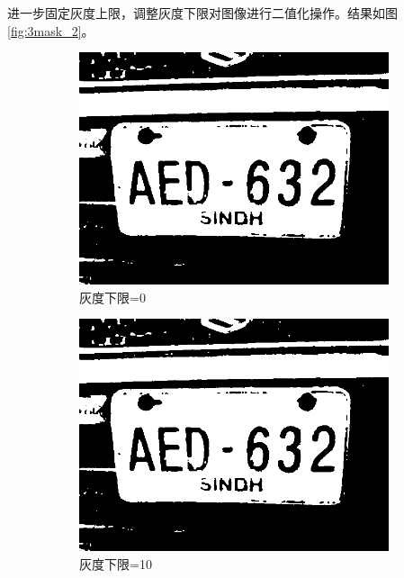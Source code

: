 \documentclass[a4paper]{ctexart}
\newcommand{\outwfour}{0.23\textwidth}
\begin{document}
\begin{spacing}{1.35}
	进一步固定灰度上限，调整灰度下限对图像进行二值化操作。结果如图\ref{fig:3mask_2}。
	\begin{figure}[htbp]
		\centering
		\begin{subfigure}[t]{\outwfour}
			\centering
			\includegraphics[width=\textwidth]{figure/3mask_2_1.png}
			\caption{灰度下限=0}
		\end{subfigure}
		\begin{subfigure}[t]{\outwfour}
			\centering
			\includegraphics[width=\textwidth]{figure/3mask_2_2.png}
			\caption{灰度下限=10}
		\end{subfigure}
		\begin{subfigure}[t]{\outwfour}
			\centering

\end{subfigure}
\end{figure}
\end{spacing}
\end{document}
